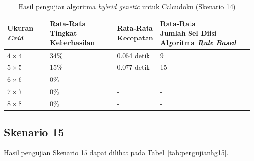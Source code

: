\begin{table}
\centering
\captionsetup{justification=centering}
\caption[Hasil pengujian algoritma \textit{hybrid genetic} untuk Calcudoku (Skenario 14)]{Hasil pengujian algoritma \textit{hybrid genetic} untuk Calcudoku (Skenario 14)}
\begin{tabular}{| l | l | l | l |}
\hline
Ukuran \textit{Grid} & \makecell[l]{Rata-Rata \\ Tingkat Keberhasilan} & \makecell[l]{Rata-Rata \\ Kecepatan} & \makecell[l]{Rata-Rata \\ Jumlah Sel Diisi Algoritma \textit{Rule Based}} \\
\hline \hline
\begin{math}4 \times 4\end{math} & 34\% & 0.054 detik & 9 \\
\hline
\begin{math}5 \times 5\end{math} & 15\% & 0.077 detik & 15 \\
\hline
\begin{math}6 \times 6\end{math} & 0\% & - & - \\
\hline
\begin{math}7 \times 7\end{math} & 0\% & - & - \\
\hline
\begin{math}8 \times 8\end{math} & 0\% & - & - \\
\hline
\end{tabular}
\label{tab:pengujianhg14}
\end{table}

\subsection{Skenario 15}
\label{sec:skenario15}

Hasil pengujian Skenario 15 dapat dilihat pada Tabel~\ref{tab:pengujianhg15}.

